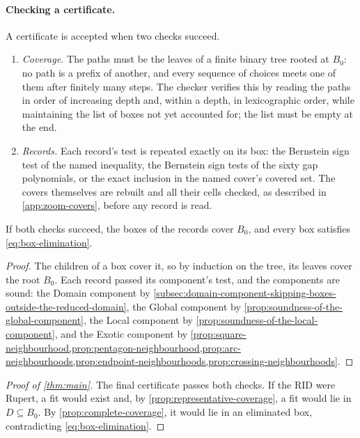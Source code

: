 \paragraph{Checking a certificate.}
A certificate is accepted when two checks succeed.
\begin{enumerate}
  \item \emph{Coverage.} The paths must be the leaves of a finite binary
    tree rooted at $B_0$: no path is a prefix of another, and every
    sequence of choices meets one of them after finitely many steps. The
    checker verifies this by reading the paths in order of increasing depth
    and, within a depth, in lexicographic order, while maintaining the list
    of boxes not yet accounted for; the list must be empty at the end.
  \item \emph{Records.} Each record's test is repeated exactly on its box:
    the Bernstein sign test of the named inequality, the Bernstein sign
    tests of the sixty gap polynomials, or the exact inclusion in the named
    cover's covered set. The covers themselves are rebuilt and all their
    cells checked, as described in \cref{app:zoom-covers}, before any
    record is read.
\end{enumerate}

\begin{proposition}\label{prop:complete-coverage}
  If both checks succeed, the boxes of the records cover $B_0$, and every
  box satisfies \cref{eq:box-elimination}.
\end{proposition}
\begin{proof}
  The children of a box cover it, so by induction on the tree, its leaves
  cover the root $B_0$. Each record passed its component's test, and the
  components are sound: the Domain component by
  \cref{subsec:domain-component-skipping-boxes-outside-the-reduced-domain},
  the Global component by \cref{prop:soundness-of-the-global-component},
  the Local component by \cref{prop:soundness-of-the-local-component}, and
  the Exotic component by
  \cref{prop:square-neighbourhood,prop:pentagon-neighbourhood,prop:arc-neighbourhoods,prop:endpoint-neighbourhoods,prop:crossing-neighbourhoods}.
\end{proof}

\begin{proof}[Proof of \cref{thm:main}]
  The final certificate passes both checks. If the RID were Rupert, a fit
  would exist and, by \cref{prop:representative-coverage}, a fit would lie
  in $D\subseteq B_0$. By \cref{prop:complete-coverage}, it would lie in an
  eliminated box, contradicting \cref{eq:box-elimination}.
\end{proof}

